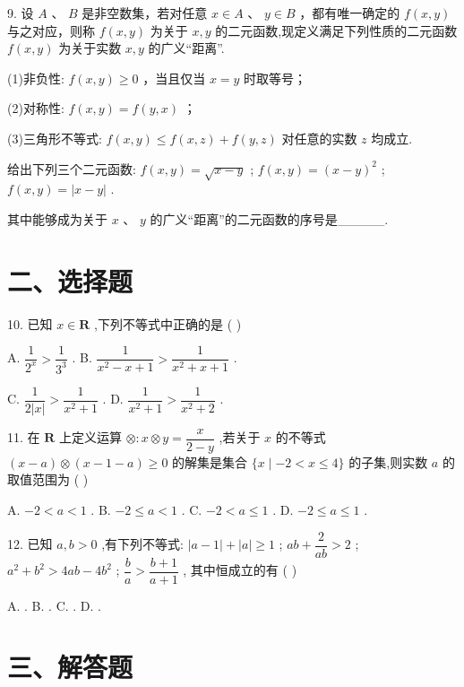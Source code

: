 9. 设 $A$ 、 $B$ 是非空数集，若对任意 $x \in  A$ 、 $y \in  B$ ，都有唯一确定的 $f\left( {x,y}\right)$ 与之对应，则称 $f\left( {x,y}\right)$ 为关于 $x,y$ 的二元函数,现定义满足下列性质的二元函数 $f\left( {x,y}\right)$ 为关于实数 $x,y$ 的广义“距离”.

(1)非负性: $f\left( {x,y}\right)  \geq  0$ ，当且仅当 $x = y$ 时取等号；

(2)对称性: $f\left( {x,y}\right)  = f\left( {y,x}\right)$ ；

(3)三角形不等式: $f\left( {x,y}\right)  \leq  f\left( {x,z}\right)  + f\left( {y,z}\right)$ 对任意的实数 $z$ 均成立.

给出下列三个二元函数:   $f\left( {x,y}\right)  = \sqrt{x - y}$ ;    $f\left( {x,y}\right)  = {\left( x - y\right) }^{2}$ ;    $f\left( {x,y}\right)  = \left| {x - y}\right|$ .

其中能够成为关于 $x$ 、 $y$ 的广义“距离”的二元函数的序号是\_\_\_\_\_.

\section*{二、选择题}

10. 已知 $x \in  \mathbf{R}$ ,下列不等式中正确的是 ( )

A. $\dfrac{1}{{2}^{x}} > \dfrac{1}{{3}^{3}}$ . B. $\dfrac{1}{{x}^{2} - x + 1} > \dfrac{1}{{x}^{2} + x + 1}$ .

C. $\dfrac{1}{2\left| x\right| } > \dfrac{1}{{x}^{2} + 1}$ . D. $\dfrac{1}{{x}^{2} + 1} > \dfrac{1}{{x}^{2} + 2}$ .

11. 在 $\mathbf{R}$ 上定义运算 $\otimes   : x \otimes  y = \dfrac{x}{2 - y}$ ,若关于 $x$ 的不等式 $\left( {x - a}\right)  \otimes  \left( {x - 1 - a}\right)  \geq  0$ 的解集是集合 $\{ x \mid   - 2 < x \leq  4\}$ 的子集,则实数 $a$ 的取值范围为 ( )

A. $- 2 < a < 1$ . B. $- 2 \leq  a < 1$ . C. $- 2 < a \leq  1$ . D. $- 2 \leq  a \leq  1$ .

12. 已知 $a,b > 0$ ,有下列不等式:    $\left| {a - 1}\right|  + \left| a\right|  \geq  1$ ;    ${ab} + \dfrac{2}{ab} > 2$ ;    ${a}^{2} + {b}^{2} > {4ab} - 4{b}^{2}$ ;    $\dfrac{b}{a} > \dfrac{b + 1}{a + 1}$ , 其中恒成立的有 ( )

A.     . B.     . C.       . D.     .

\section*{三、解答题}

